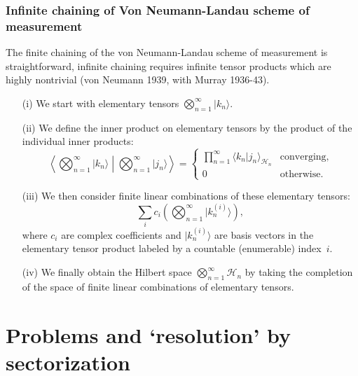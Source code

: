 \documentclass[amsmath,table,sans,amsfonts,hyperref={colorlinks,citecolor=blue,linkcolor=blue,urlcolor=purple}]{beamer}
\begin{document}
\begin{frame}%
 \frametitle{Infinite chaining of Von Neumann-Landau scheme of measurement}

{\footnotesize
The finite chaining of the von Neumann-Landau scheme of measurement is straightforward,
infinite chaining requires infinite tensor products which are highly nontrivial
(von Neumann  1939, with Murray 1936-43).
\begin{itemize}

\item[(i)]
We start with elementary tensors \(\bigotimes_{n=1}^\infty \vert k_n \rangle \).

\item[(ii)]
We define the inner product on elementary tensors by the product of the individual inner products:
\[ \left\langle \bigotimes_{n=1}^\infty \vert k_n\rangle \middle| \bigotimes_{n=1}^\infty \vert j_n\rangle  \right\rangle
= \begin{cases}
    \prod_{n=1}^\infty \langle k_n \vert j_n \rangle_{\mathcal{H}_n} &  \text{converging,}\\
    0 & \text{otherwise.}
\end{cases}
\]

\item[(iii)]
We then consider finite linear combinations of these elementary tensors:
   \[ \sum_{i} c_i \left( \bigotimes_{n=1}^\infty \vert {k_n^{(i)}} \rangle \right), \]
   where \(c_i\) are complex coefficients and \(\vert k_n^{(i)} \rangle\)
are basis vectors in the elementary tensor product labeled by a \colorbox{yellow!30}{\color{red}countable (enumerable) index~$i$}.

\item[(iv)]
We finally obtain the Hilbert space \(\bigotimes_{n=1}^\infty \mathcal{H}_n\)
by taking the completion of the space of finite linear combinations of elementary tensors.

\end{itemize}

}

\end{frame}

\section{Problems and `resolution' by sectorization}
\end{document}
